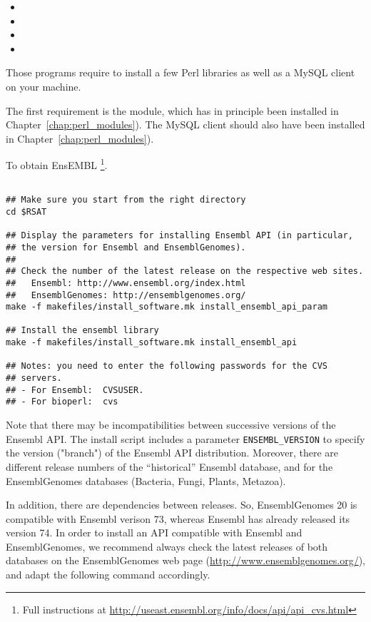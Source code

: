 \documentclass[12pt,a4paper, oneside]{scrreprt} %
\begin{document}
\begin{itemize}
\item {}
\item {}
\item {} 
\item {}
\end{itemize}

Those programs require to install a few Perl libraries as well as a
MySQL client on your machine.

The first requirement is the  module, which has in
principle been installed in Chapter~\ref{chap:perl_modules}). The
MySQL client should also have been installed in
Chapter~\ref{chap:perl_modules}).

To obtain EnsEMBL \footnote{Full instructions at
  \url{http://useast.ensembl.org/info/docs/api/api_cvs.html}}.

\begin{lstlisting}

## Make sure you start from the right directory
cd $RSAT

## Display the parameters for installing Ensembl API (in particular,
## the version for Ensembl and EnsemblGenomes).
##
## Check the number of the latest release on the respective web sites. 
##   Ensembl: http://www.ensembl.org/index.html
##   EnsemblGenomes: http://ensemblgenomes.org/
make -f makefiles/install_software.mk install_ensembl_api_param

## Install the ensembl library
make -f makefiles/install_software.mk install_ensembl_api 

## Notes: you need to enter the following passwords for the CVS
## servers.
## - For Ensembl:  CVSUSER.
## - For bioperl:  cvs

\end{lstlisting}


Note that there may be incompatibilities between successive versions
of the Ensembl API. The install script includes a parameter
\texttt{ENSEMBL\_VERSION} to specify the version ("branch") of the
Ensembl API distribution.  Moreover, there are different release
numbers of the ``historical'' Ensembl database, and for the
EnsemblGenomes databases (Bacteria, Fungi, Plants, Metazoa).

In addition, there are dependencies between releases. So,
EnsemblGenomes 20 is compatible with Ensembl verison 73, whereas
Ensembl has already released its version 74. In order to install an
API compatible with Ensembl and EnsemblGenomes, we recommend always
check the latest releases of both databases on the EnsemblGenomes web
page (\url{http://www.ensemblgenomes.org/}), and adapt the following
command accordingly.
\end{document}
